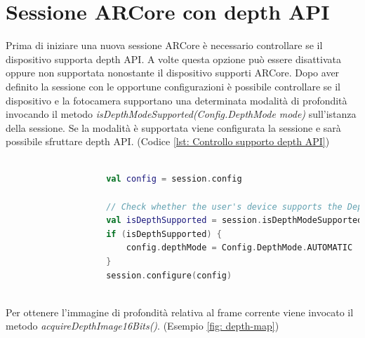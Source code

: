 \documentclass[crop=false, class=book]{standalone}
\begin{document}
		
		\section{Sessione ARCore con depth API}
		
			Prima di iniziare una nuova sessione ARCore è necessario controllare se il dispositivo supporta depth API. A volte 				questa opzione può essere disattivata oppure non supportata nonostante il dispositivo supporti ARCore. Dopo aver 				definito la sessione con le opportune configurazioni è possibile controllare se il dispositivo e la fotocamera 					supportano una determinata modalità di profondità invocando il metodo \textit{isDepthModeSupported(Config.DepthMode 			mode)} sull'istanza della sessione. Se la modalità è supportata viene configurata la sessione e sarà possibile 					sfruttare depth API. (Codice \vref{lst: Controllo supporto depth API})\\
		
			\begin{center}
				\begin{minipage}{0.95\textwidth}
					\begin{lstlisting}[caption={ Controllo supporto depth API}, label={lst: Controllo supporto depth API}, 		language=Kotlin]
				
					val config = session.config

					// Check whether the user's device supports the Depth API.
					val isDepthSupported = session.isDepthModeSupported(Config.DepthMode.AUTOMATIC)
					if (isDepthSupported) {
  						config.depthMode = Config.DepthMode.AUTOMATIC
					}
					session.configure(config)
				
					\end{lstlisting}
			\end{minipage}
		\end{center}
		
		\begin{flushleft}
		Per ottenere l'immagine di profondità relativa al frame corrente viene invocato il metodo 										\textit{acquireDepthImage16Bits()}. (Esempio \vref{fig: depth-map})\\
		\end{flushleft}
		
\end{document}
